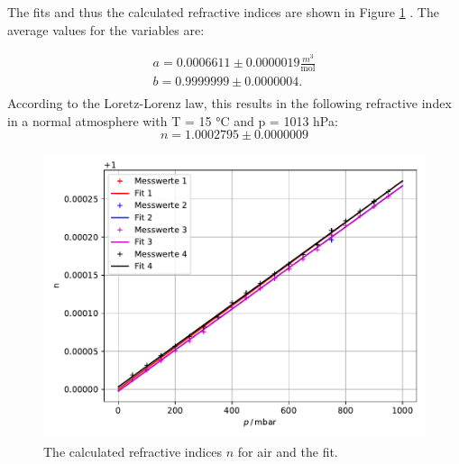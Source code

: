 The fits and thus the calculated refractive indices are shown in Figure \ref{fig:lorentz_lorenz} .
The average values for the variables are:

\begin{align*}
  a = 0.0006611 \pm 0.0000019 \frac{m^3}{\text{mol}}\\
  b = 0.9999999 \pm 0.0000004. \\
\end{align*}
According to the Loretz-Lorenz law, this results in the following refractive index in a normal atmosphere with T = 15 °C and p = 1013 hPa:
\begin{equation}
  n = 1.0002795 \pm 0.0000009
\end{equation}

\begin{figure}[H]
  \centering
  \includegraphics[width=\textwidth]{plots/lorentz_lorenz.pdf}
  \caption{The calculated refractive indices $n$ for air and the fit.}
  \label{fig:lorentz_lorenz}
\end{figure}


